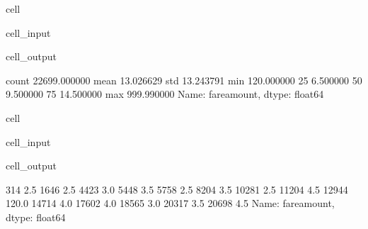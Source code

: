 \documentclass[letterpaper,10pt,english]{sphinxmanual}
\begin{document}
\begin{sphinxuseclass}{cell}
\begin{sphinxuseclass}{cell_input}
\begin{sphinxVerbatim}[commandchars=\\\{\}]
\PYG{p}{[}\PYG{p}{]}
\end{sphinxVerbatim}

\end{sphinxuseclass}
\begin{sphinxuseclass}{cell_output}
\begin{sphinxVerbatim}[commandchars=\\\{\}]
count    22699.000000
mean        13.026629
std         13.243791
min       \PYGZhy{}120.000000
25\PYGZpc{}          6.500000
50\PYGZpc{}          9.500000
75\PYGZpc{}         14.500000
max        999.990000
Name: fare\PYGZus{}amount, dtype: float64
\end{sphinxVerbatim}

\end{sphinxuseclass}
\end{sphinxuseclass}
\begin{sphinxuseclass}{cell}
\begin{sphinxuseclass}{cell_input}
\begin{sphinxVerbatim}[commandchars=\\\{\}]
\PYG{p}{[}\PYG{p}{]}\PYG{p}{[}\PYG{p}{[}\PYG{p}{]}  \PYG{p}{]}
\end{sphinxVerbatim}

\end{sphinxuseclass}
\begin{sphinxuseclass}{cell_output}
\begin{sphinxVerbatim}[commandchars=\\\{\}]
314       \PYGZhy{}2.5
1646      \PYGZhy{}2.5
4423      \PYGZhy{}3.0
5448      \PYGZhy{}3.5
5758      \PYGZhy{}2.5
8204      \PYGZhy{}3.5
10281     \PYGZhy{}2.5
11204     \PYGZhy{}4.5
12944   \PYGZhy{}120.0
14714     \PYGZhy{}4.0
17602     \PYGZhy{}4.0
18565     \PYGZhy{}3.0
20317     \PYGZhy{}3.5
20698     \PYGZhy{}4.5
Name: fare\PYGZus{}amount, dtype: float64
\end{sphinxVerbatim}

\end{sphinxuseclass}
\end{sphinxuseclass}
\end{document}
